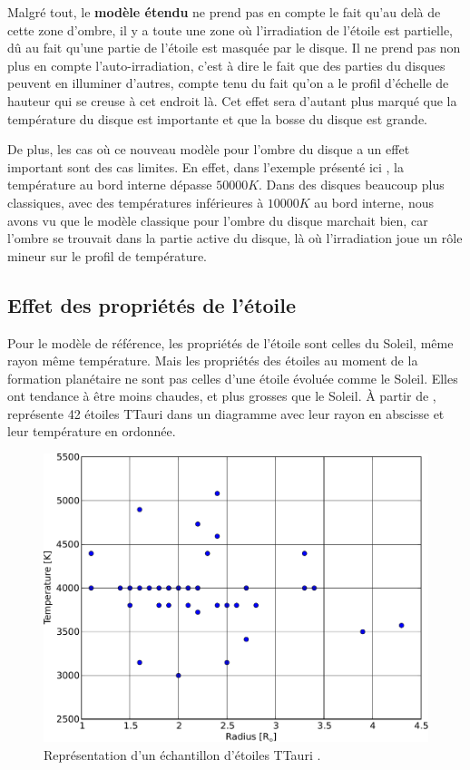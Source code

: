 Malgré tout, le \textbf{modèle étendu} ne prend pas en compte le fait qu'au delà de cette zone d'ombre, il y a toute une zone où l'irradiation de l'étoile est partielle, dû au fait qu'une partie de l'étoile est masquée par le disque. Il ne prend pas non plus en compte l'auto-irradiation, c'est à dire le fait que des parties du disques peuvent en illuminer d'autres, compte tenu du fait qu'on a le profil d'échelle de hauteur qui se creuse à cet endroit là. Cet effet sera d'autant plus marqué que la température du disque est importante et que la bosse du disque est grande. 

De plus, les cas où ce nouveau modèle pour l'ombre du disque a un effet important sont des cas limites. En effet, dans l'exemple présenté ici , la température au bord interne dépasse $50 000\unit{K}$. Dans des disques beaucoup plus classiques, avec des températures inférieures à $10 000\unit{K}$ au bord interne, nous avons vu que le modèle classique pour l'ombre du disque marchait bien, car l'ombre se trouvait dans la partie active du disque, là où l'irradiation joue un rôle mineur sur le profil de température.

\subsection{Effet des propriétés de l'étoile}
Pour le modèle de référence, les propriétés de l'étoile sont celles du Soleil, même rayon même température. Mais les propriétés des étoiles au moment de la formation planétaire ne sont pas celles d'une étoile évoluée comme le Soleil. Elles ont tendance à être moins chaudes, et plus grosses que le Soleil. À partir de \cite[Table 2]{hartigan1995disk},  représente 42 étoiles TTauri dans un diagramme avec leur rayon en abscisse et leur température en ordonnée. 

\begin{figure}[htbp]
\centering
\includegraphics[width=0.5\linewidth]{figure/TTauri_sample.pdf}
\caption{Représentation d'un échantillon d'étoiles TTauri \citep{hartigan1995disk}. }\label{fig:TTauri_sample}
\end{figure}

